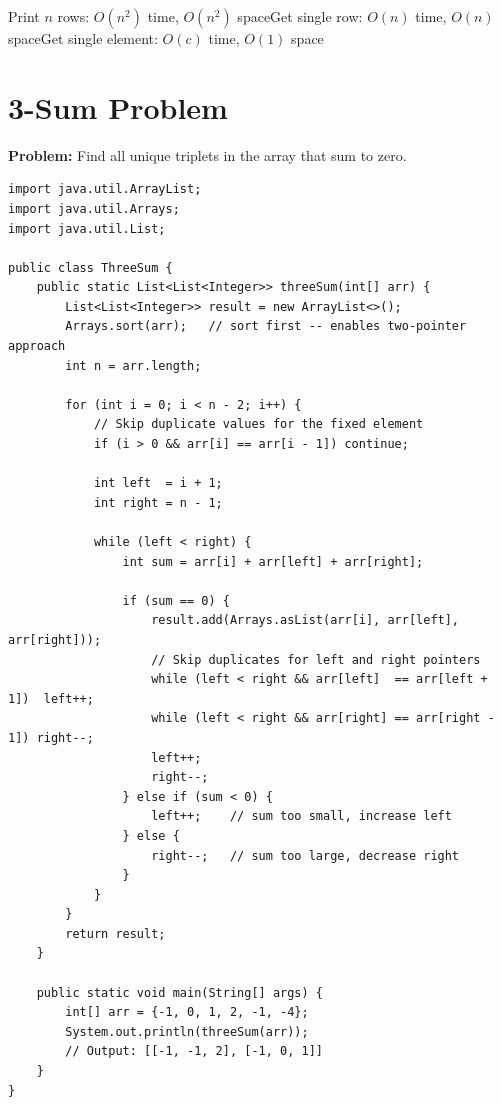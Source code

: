 \documentclass[12pt,a4paper,oneside]{book}
\begin{document}
\begin{complexity}
Print $n$ rows: $O(n^2)$ time, $O(n^2)$ space\quad Get single row: $O(n)$ time, $O(n)$ space\quad Get single element: $O(c)$ time, $O(1)$ space
\end{complexity}

\section{3-Sum Problem}

\textbf{Problem:} Find all unique triplets in the array that sum to zero.

\begin{lstlisting}[caption={3-Sum --- Sort + Two Pointer, O(n$^2$)}]
import java.util.ArrayList;
import java.util.Arrays;
import java.util.List;

public class ThreeSum {
    public static List<List<Integer>> threeSum(int[] arr) {
        List<List<Integer>> result = new ArrayList<>();
        Arrays.sort(arr);   // sort first -- enables two-pointer approach
        int n = arr.length;

        for (int i = 0; i < n - 2; i++) {
            // Skip duplicate values for the fixed element
            if (i > 0 && arr[i] == arr[i - 1]) continue;

            int left  = i + 1;
            int right = n - 1;

            while (left < right) {
                int sum = arr[i] + arr[left] + arr[right];

                if (sum == 0) {
                    result.add(Arrays.asList(arr[i], arr[left], arr[right]));
                    // Skip duplicates for left and right pointers
                    while (left < right && arr[left]  == arr[left + 1])  left++;
                    while (left < right && arr[right] == arr[right - 1]) right--;
                    left++;
                    right--;
                } else if (sum < 0) {
                    left++;    // sum too small, increase left
                } else {
                    right--;   // sum too large, decrease right
                }
            }
        }
        return result;
    }

    public static void main(String[] args) {
        int[] arr = {-1, 0, 1, 2, -1, -4};
        System.out.println(threeSum(arr));
        // Output: [[-1, -1, 2], [-1, 0, 1]]
    }
}
\end{lstlisting}
\end{document}
